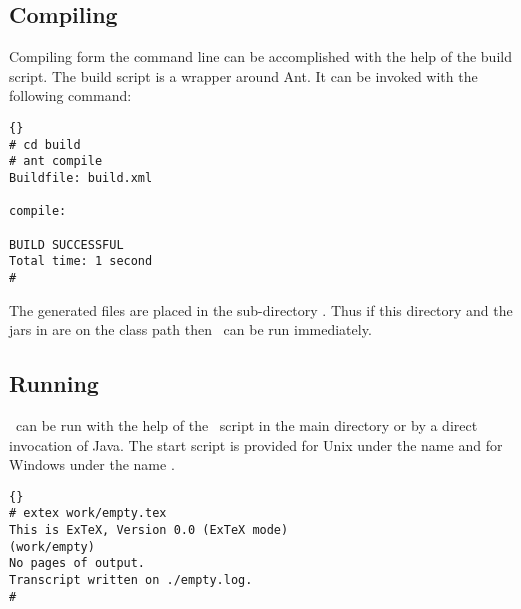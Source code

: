 %

\subsection{Compiling \ExTeX}\label{sec:shell-compile}

Compiling \ExTeX form the command line can be accomplished with the
help of the build script. The build script is a wrapper around Ant. It
can be invoked with the following command:

\begin{lstlisting}{}
# cd build
# ant compile
Buildfile: build.xml

compile:

BUILD SUCCESSFUL
Total time: 1 second
#
\end{lstlisting}

The generated files are placed in the sub-directory
. Thus if this directory and the jars in
 are on the class path then \ExTeX\ can be run immediately.


\subsection{Running \ExTeX}

\ExTeX\ can be run with the help of the \ExTeX\ script in the main
directory or by a direct invocation of Java. The start script is
provided for Unix under the name  and for Windows under
the name .
\begin{lstlisting}{}
# extex work/empty.tex
This is ExTeX, Version 0.0 (ExTeX mode)
(work/empty)
No pages of output.
Transcript written on ./empty.log.
#
\end{lstlisting}{}


